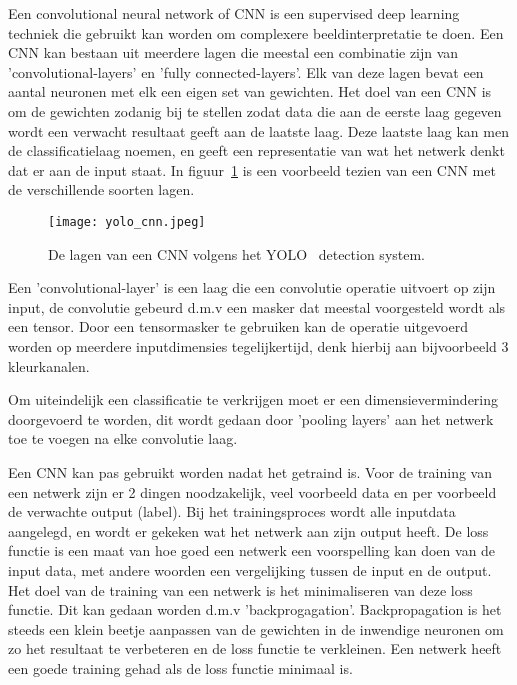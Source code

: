             Een convolutional neural network of CNN is een supervised deep learning techniek die gebruikt kan worden om complexere beeldinterpretatie te doen.
            Een CNN kan bestaan uit meerdere lagen die meestal een combinatie zijn van 'convolutional-layers' en 'fully connected-layers'. Elk van deze lagen bevat een aantal neuronen met elk een eigen set van gewichten.
            Het doel van een CNN is om de gewichten zodanig bij te stellen zodat data die aan de eerste laag gegeven wordt een verwacht resultaat geeft aan de laatste laag. 
            Deze laatste laag kan men de classificatielaag noemen, en geeft een representatie van wat het netwerk denkt dat er aan de input staat. In figuur~\ref{fig:yolo_cnn} is een voorbeeld tezien van een CNN met de verschillende soorten lagen.

            \begin{figure}[!hb]
                \centering
                \texttt{[image: yolo\_cnn.jpeg]}
                \caption{De lagen van een CNN volgens het YOLO~\cite{Redmon_2016} detection system.}
                \label{fig:yolo_cnn}
            \end{figure}

            Een 'convolutional-layer' is een laag die een convolutie operatie uitvoert op zijn input, de convolutie gebeurd d.m.v een masker dat meestal voorgesteld wordt als een tensor.
            Door een tensormasker te gebruiken kan de operatie uitgevoerd worden op meerdere inputdimensies tegelijkertijd, denk hierbij aan bijvoorbeeld 3 kleurkanalen.

            Om uiteindelijk een classificatie te verkrijgen moet er een dimensievermindering doorgevoerd te worden, dit wordt gedaan door 'pooling layers' aan het netwerk toe te voegen na elke convolutie laag. 

            Een CNN kan pas gebruikt worden nadat het getraind is. Voor de training van een netwerk zijn er 2 dingen noodzakelijk, veel voorbeeld data en per voorbeeld de verwachte output (label).
            Bij het trainingsproces wordt alle inputdata aangelegd, en wordt er gekeken wat het netwerk aan zijn output heeft.
            De loss functie is een maat van hoe goed een netwerk een voorspelling kan doen van de input data, met andere woorden een vergelijking tussen de input en de output. Het doel van de training van een netwerk is het minimaliseren
            van deze loss functie. Dit kan gedaan worden d.m.v 'backprogagation'. Backpropagation is het steeds een klein beetje aanpassen van de gewichten in de inwendige neuronen om zo het resultaat te verbeteren en de loss functie te verkleinen.
            Een netwerk heeft een goede training gehad als de loss functie minimaal is.

